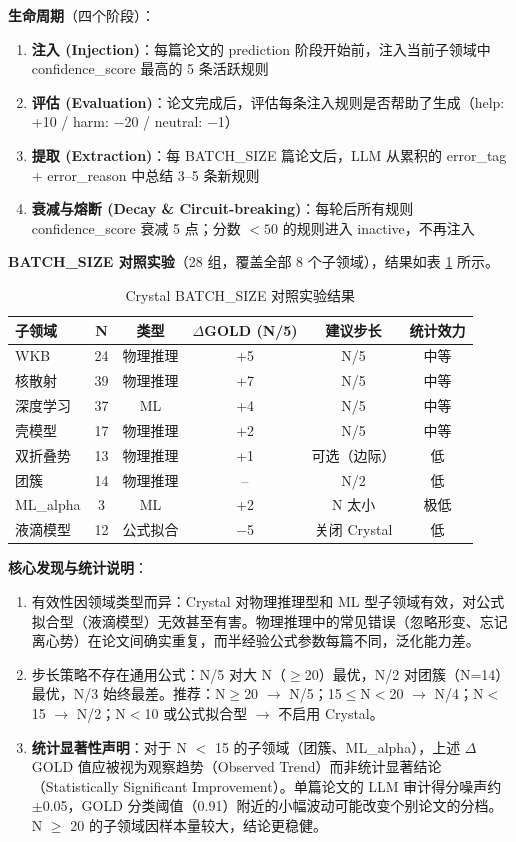 \documentclass[12pt,a4paper]{article}
\begin{document}
\textbf{生命周期}（四个阶段）：
\begin{enumerate}
\item \textbf{注入 (Injection)}：每篇论文的 prediction 阶段开始前，注入当前子领域中 confidence\_score 最高的 5 条活跃规则
\item \textbf{评估 (Evaluation)}：论文完成后，评估每条注入规则是否帮助了生成（help: +10 / harm: $-$20 / neutral: $-$1）
\item \textbf{提取 (Extraction)}：每 BATCH\_SIZE 篇论文后，LLM 从累积的 error\_tag + error\_reason 中总结 3--5 条新规则
\item \textbf{衰减与熔断 (Decay \& Circuit-breaking)}：每轮后所有规则 confidence\_score 衰减 5 点；分数 $< 50$ 的规则进入 inactive，不再注入
\end{enumerate}

\textbf{BATCH\_SIZE 对照实验}（28 组，覆盖全部 8 个子领域），结果如表 \ref{tab:crystal} 所示。

\begin{table}[h]
\centering
\caption{Crystal BATCH\_SIZE 对照实验结果}
\label{tab:crystal}
\begin{tabular}{lccccc}
\toprule
\textbf{子领域} & \textbf{N} & \textbf{类型} & $\Delta$GOLD (N/5) & \textbf{建议步长} & \textbf{统计效力} \\
\midrule
WKB & 24 & 物理推理 & +5 & N/5 & 中等 \\
核散射 & 39 & 物理推理 & +7 & N/5 & 中等 \\
深度学习 & 37 & ML & +4 & N/5 & 中等 \\
壳模型 & 17 & 物理推理 & +2 & N/5 & 中等 \\
双折叠势 & 13 & 物理推理 & +1 & 可选（边际） & 低 \\
团簇 & 14 & 物理推理 & -- & N/2 & 低 \\
ML\_alpha & 3 & ML & +2 & N 太小 & 极低 \\
液滴模型 & 12 & 公式拟合 & $-$5 & 关闭 Crystal & 低 \\
\bottomrule
\end{tabular}
\end{table}

\textbf{核心发现与统计说明}：

\begin{enumerate}
\item 有效性因领域类型而异：Crystal 对物理推理型和 ML 型子领域有效，对公式拟合型（液滴模型）无效甚至有害。物理推理中的常见错误（忽略形变、忘记离心势）在论文间确实重复，而半经验公式参数每篇不同，泛化能力差。
\item 步长策略不存在通用公式：N/5 对大 N（$\geq$20）最优，N/2 对团簇（N=14）最优，N/3 始终最差。推荐：N$\geq$20 $\rightarrow$ N/5；15$\leq$N$<$20 $\rightarrow$ N/4；N$<$15 $\rightarrow$ N/2；N$<$10 或公式拟合型 $\rightarrow$ 不启用 Crystal。
\item \textbf{统计显著性声明}：对于 N $<$ 15 的子领域（团簇、ML\_alpha），上述 $\Delta$GOLD 值应被视为观察趋势（Observed Trend）而非统计显著结论（Statistically Significant Improvement）。单篇论文的 LLM 审计得分噪声约 $\pm$0.05，GOLD 分类阈值（0.91）附近的小幅波动可能改变个别论文的分档。N $\geq$ 20 的子领域因样本量较大，结论更稳健。
\end{enumerate}
\end{document}
